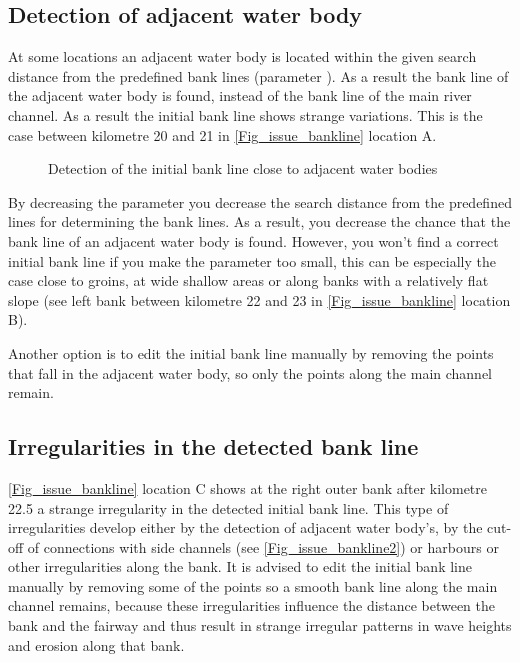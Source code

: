 \subsection{Detection of adjacent water body}
At some locations an adjacent water body is located within the given search distance from the predefined
bank lines (parameter ).
As a result the bank line of the adjacent water body is found, instead of the bank line of the main river channel.
As a result the initial bank line shows strange variations.
This is the case between kilometre 20 and 21 in \autoref{Fig_issue_bankline} location A.

\begin{figure}[!hb]
	\center
	\resizebox{15cm}{!}{
		
	}
	\caption{Detection of the initial bank line close to adjacent water bodies}
	\label{Fig_issue_bankline}
\end{figure}

By decreasing the parameter  you decrease the search distance from the predefined lines
for determining the bank lines.
As a result, you decrease the chance that the bank line of an adjacent water  body is found.
However, you won't find a correct initial bank line if you make the parameter  too small,
this can be especially the case close to groins, at wide shallow areas or along banks with a relatively
flat slope (see left bank between kilometre 22 and 23 in \autoref{Fig_issue_bankline} location B).

Another option is to edit the initial bank line manually by removing the points that fall in the adjacent water body, so only the points along the main channel remain.

\subsection{Irregularities in the detected bank line}
\autoref{Fig_issue_bankline} location C shows at the right outer bank after kilometre 22.5 a strange irregularity in the detected initial bank line.
This type of irregularities develop either by the detection of adjacent water body's, by the cut-off of connections with side channels (see \autoref{Fig_issue_bankline2}) or harbours or other irregularities along the bank.
It is advised to edit the initial bank line manually by removing some of the points so a smooth bank line along the main channel remains, because these irregularities influence the distance between the bank and the fairway and thus result in strange irregular patterns in wave heights and erosion along that bank.

